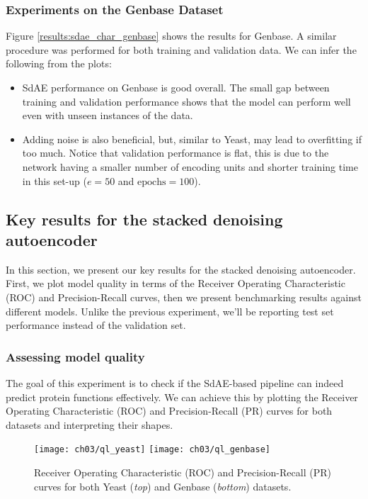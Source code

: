 \subsubsection{Experiments on the Genbase Dataset}

Figure \ref{results:sdae_char_genbase} shows the results for Genbase. A similar
procedure was performed for both training and validation data. We can infer
the following from the plots:

\begin{itemize}
  \item SdAE performance on Genbase is good overall. The small gap between
      training and validation performance shows that the model can perform well
      even with unseen instances of the data.
  \item Adding noise is also beneficial, but, similar to Yeast, may lead to
      overfitting if too much. Notice that validation performance is flat, this
      is due to the network having a smaller number of encoding units and
      shorter training time in this set-up ($e=50$ and $\text{epochs}=100$).
\end{itemize}

\subsection{Key results for the stacked denoising autoencoder}

In this section, we present our key results for the stacked denoising
autoencoder. First, we plot model quality in terms of the Receiver Operating
Characteristic (ROC) and Precision-Recall curves, then we present
benchmarking results against different models. Unlike the previous
experiment, we'll be reporting test set performance instead of the validation
set.

\subsubsection{Assessing model quality}

\par The goal of this experiment is to check if the SdAE-based pipeline can
indeed predict protein functions effectively. We can achieve this by plotting
the Receiver Operating Characteristic (ROC) and Precision-Recall (PR) curves
for both datasets and interpreting their shapes. 

\begin{figure}[!h]
  \centering
  \texttt{[image: ch03/ql\_yeast]}
  \texttt{[image: ch03/ql\_genbase]}
  \caption[Receiver Operating Characteristic (ROC) and Precision-Recall (PR)
  curves for the two protein benchmarks]{
    Receiver Operating Characteristic (ROC) and Precision-Recall (PR) curves
    for both Yeast (\textit{top}) and Genbase (\textit{bottom}) datasets.
  }
  \label{results:sdae_quality}
\end{figure}


